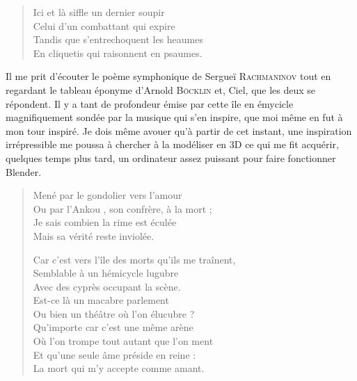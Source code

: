 \begin{verse}\quatrain
  Ici et là siffle un dernier soupir\\ 
  Celui d’un combattant qui expire\\ 
  Tandis que s’entrechoquent les heaumes\\ 
  En cliquetis qui raisonnent en psaumes.  %
\end{verse}

\begin{prose}
  Il me prit d’écouter le poème symphonique  de Sergueï \textsc{Rachmaninov} tout en regardant le tableau éponyme d’Arnold \textsc{Böcklin} et, Ciel, que les deux se répondent. Il y a tant de profondeur émise par cette île en émycicle magnifiquement sondée par la musique qui s’en inspire, que moi même en fut  à mon tour inspiré. Je dois même avouer qu’à partir de cet instant, une inspiration irrépressible me poussa à chercher à la modéliser en 3D ce qui me fit acquérir, quelques temps plus tard, un ordinateur assez puissant pour faire fonctionner Blender.
\end{prose}

\begin{verse}\quatrain\neuvain
  Mené par le gondolier vers l’amour\\ 
  Ou par l’Ankou%
  , son confrère, à la mort ;\\  %
Je sais combien la rime est éculée\\ 
  Mais sa vérité reste inviolée.  %

  Car c’est vers l’île des morts qu’ils me traînent,\\ 
  Semblable à un hémicycle lugubre\\ 
  Avec des cyprès occupant la scène.\\ 
  Est-ce là un macabre parlement\\ 
  Ou bien un théâtre où l’on élucubre ?\\ 
  Qu’importe car c’est une même arène\\ 
  Où l’on trompe tout autant que l’on ment\\ 
  Et qu’une seule âme préside en reine :\\ 
  La mort qui m’y accepte comme amant.  %
\end{verse}

